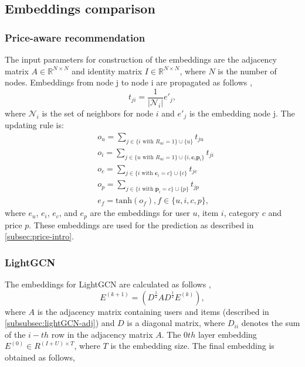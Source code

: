 \subsection{Embeddings comparison}
\subsubsection{Price-aware recommendation}\label{subsubsec:price}
The input parameters for construction of the embeddings are the adjacency matrix $A \in \mathbb{R}^{N \times N}$ and identity matrix $I \in \mathbb{R}^{N \times N}$, where $N$ is the number of nodes.
Embeddings from node j to node i are propagated as follows \cite{Priceaware},
\begin{equation}
    t_{ji} = \frac{1}{|\mathcal{N}_i|}e'_j,
\end{equation}
where $\mathcal{N}_i$ is the set of neighbors for node $i$ and $e'_j$ is the embedding node j.
The updating rule is:
\begin{align*}
     & o_u = \sum_{j \in \{i \textrm{ with } R_{ui}=1 \} \cup \{ u\}}^{} t_{ju}                            \\
     & o_i = \sum_{j \in \{u \textrm{ with } R_{ui}=1 \} \cup \{ i, \textbf{c}_i \textbf{p}_i\}}^{} t_{ji} \\
     & o_c = \sum_{j \in \{i \textrm{ with } \textbf{c}_i=c \} \cup \{ c\}}^{} t_{jc}                      \\
     & o_p = \sum_{j \in \{i \textrm{ with } \textbf{p}_i=c \} \cup \{ p\}}^{} t_{jp}                      \\
     & e_f = \textrm{tanh}(o_f), f \in \{u, i, c, p\},
\end{align*}
where $e_u$, $e_i$, $e_c$, and $e_p$ are the embeddings for user $u$, item $i$, category $c$ and price $p$.
These embeddings are used for the prediction as described in \autoref{subsec:price-intro}.

\subsubsection{LightGCN}\label{subsubsec:lightgcn-embedding}
The embeddings for LightGCN are calculated as follows \cite{lightgcn},
\begin{equation}
    E^{(k+1)} = (D^{\frac{1}{2}}AD^{\frac{1}{2}}E^{(k)}),
\end{equation}
where $A$ is the adjacency matrix containing users and items (described in \autoref{subsubsec:lightGCN-adj}) and $D$ is a diagonal matrix, where $D_{ii}$ denotes the sum of the $i-th$ row in the adjacency matrix $A$.
The $0th$ layer embedding $E^{(0)} \in R^{(I + U)\times T}$, where $T$ is the embedding size.
The final embedding is obtained as follows,

